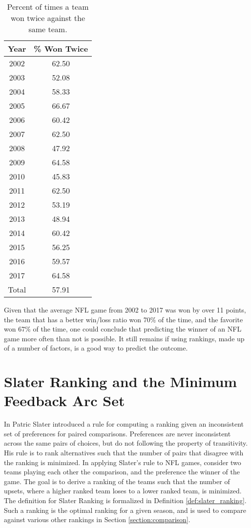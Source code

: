 \documentclass[11pt]{article}
\begin{document}
\begin{table}[!htb]
\begin{center}
\scriptsize
\begin{tabular}{|c|c|}
\hline
Year & \% Won Twice\\
\hline
2002 & 62.50\\
2003 & 52.08\\
2004 & 58.33\\
2005 & 66.67\\
2006 & 60.42\\
2007 & 62.50\\
2008 & 47.92\\
2009 & 64.58\\
2010 & 45.83\\
2011 & 62.50\\
2012 & 53.19\\
2013 & 48.94\\
2014 & 60.42\\
2015 & 56.25\\
2016 & 59.57\\
2017 & 64.58\\
\hline
Total & 57.91\\
\hline
\end{tabular}
\caption{Percent of times a team won twice against the same team.}\label{table:won_twice}
\end{center}
\end{table}

Given that the average NFL game from 2002 to 2017 was won by over 11 points, the team that has a better win/loss ratio won 70\% of the time, and the favorite won 67\% of the time, one could conclude that predicting the winner of an NFL game more often than not is possible. It still remains if using rankings, made up of a number of factors, is a good way to predict the outcome.

\section{Slater Ranking and the Minimum Feedback Arc Set}

In \cite{biometrika_slater} Patric Slater introduced a rule for computing a ranking given an inconsistent set of preferences for paired comparisons. Preferences are never inconsistent across the same pairs of choices, but do not following the property of transitivity. His rule is to rank alternatives such that the number of pairs that disagree with the ranking is minimized. In applying Slater's rule to NFL games, consider two teams playing each other the comparison, and the preference the winner of the game. The goal is to derive a ranking of the teams such that the number of upsets, where a higher ranked team loses to a lower ranked team, is minimized. The definition for Slater Ranking is formalized in Definition \ref{def:slater_ranking}. Such a ranking is the optimal ranking for a given season, and is used to compare against various other rankings in Section \ref{section:comparison}.
\end{document}
